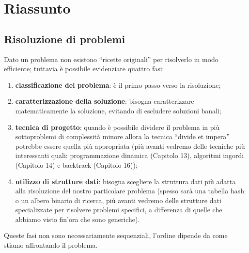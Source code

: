 
\ifsubfile
\usepackage{../settings/subfile}
\setcounter{chapter}{20}

\usepackage[newfloat, cachedir=_minted-cache, outputdir=../build]{minted}
\usepackage{../libraries/set-minted}



\fi


\chapter{Riassunto}

\section*{Risoluzione di problemi}

Dato un problema non esistono \enquote{ricette originali} per risolverlo in modo efficiente;
tuttavia è possibile evidenziare quattro fasi:
\begin{enumerate}
	\item \textbf{classificazione del problema}: è il primo passo verso la risoluzione;
	\item \textbf{caratterizzazione della soluzione}: bisogna caratterizzare matematicamente la soluzione, evitando di escludere soluzioni banali;
	\item \textbf{tecnica di progetto}: quando è possibile dividere il problema in più sottoproblemi di complessità minore allora la tecnica \enquote{divide et impera} potrebbe essere quella più appropriata (più avanti vedremo delle tecniche più interessanti quali: programmazione dinamica (Capitolo 13), algoritmi ingordi (Capitolo 14) e backtrack (Capitolo 16));
	\item \textbf{utilizzo di strutture dati}: bisogna scegliere la struttura dati più adatta alla risoluzione del nostro particolare problema (spesso sarà una tabella hash o un albero binario di ricerca, più avanti vedremo delle strutture dati specializzate per risolvere problemi specifici, a differenza di quelle che abbiamo visto fin'ora che sono generiche).
\end{enumerate}
Queste fasi non sono necessariamente sequenziali, l'ordine dipende da come stiamo affrontando il problema.

